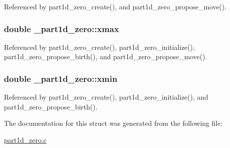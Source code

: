 Referenced by part1d\+\_\+zero\+\_\+create(), and part1d\+\_\+zero\+\_\+propose\+\_\+move().

\subsubsection[{\texorpdfstring{xmax}{xmax}}]{\setlength{\rightskip}{0pt plus 5cm}double \+\_\+part1d\+\_\+zero\+::xmax}\hypertarget{struct__part1d__zero_a581d99a73929857440416ba5efb37957}{}\label{struct__part1d__zero_a581d99a73929857440416ba5efb37957}


Referenced by part1d\+\_\+zero\+\_\+create(), part1d\+\_\+zero\+\_\+initialize(), part1d\+\_\+zero\+\_\+propose\+\_\+birth(), and part1d\+\_\+zero\+\_\+propose\+\_\+move().

\subsubsection[{\texorpdfstring{xmin}{xmin}}]{\setlength{\rightskip}{0pt plus 5cm}double \+\_\+part1d\+\_\+zero\+::xmin}\hypertarget{struct__part1d__zero_abac11d96c024ecf225c080396b508ebc}{}\label{struct__part1d__zero_abac11d96c024ecf225c080396b508ebc}


Referenced by part1d\+\_\+zero\+\_\+create(), part1d\+\_\+zero\+\_\+initialize(), and part1d\+\_\+zero\+\_\+propose\+\_\+birth().



The documentation for this struct was generated from the following file\+:\begin{DoxyCompactItemize}
\item 
\hyperlink{part1d__zero_8c}{part1d\+\_\+zero.\+c}\end{DoxyCompactItemize}
